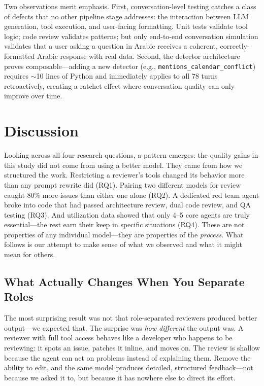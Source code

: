 \documentclass[11pt,a4paper]{article}
\begin{document}
Two observations merit emphasis. First, conversation-level testing catches a class of defects that no other pipeline stage addresses: the interaction between LLM generation, tool execution, and user-facing formatting. Unit tests validate tool logic; code review validates patterns; but only end-to-end conversation simulation validates that a user asking a question in Arabic receives a coherent, correctly-formatted Arabic response with real data. Second, the detector architecture proves composable---adding a new detector (e.g., \texttt{mentions\_calendar\_conflict}) requires $\sim$10 lines of Python and immediately applies to all 78 turns retroactively, creating a ratchet effect where conversation quality can only improve over time.

\section{Discussion}

Looking across all four research questions, a pattern emerges: the quality gains in this study did not come from using a better model. They came from how we structured the work. Restricting a reviewer's tools changed its behavior more than any prompt rewrite did (RQ1). Pairing two different models for review caught 80\% more issues than either one alone (RQ2). A dedicated red team agent broke into code that had passed architecture review, dual code review, and QA testing (RQ3). And utilization data showed that only 4--5 core agents are truly essential---the rest earn their keep in specific situations (RQ4). These are not properties of any individual model---they are properties of the \textit{process}. What follows is our attempt to make sense of what we observed and what it might mean for others.

\subsection{What Actually Changes When You Separate Roles}

The most surprising result was not that role-separated reviewers produced better output---we expected that. The surprise was \textit{how different} the output was. A reviewer with full tool access behaves like a developer who happens to be reviewing: it spots an issue, patches it inline, and moves on. The review is shallow because the agent can act on problems instead of explaining them. Remove the ability to edit, and the same model produces detailed, structured feedback---not because we asked it to, but because it has nowhere else to direct its effort.
\end{document}
